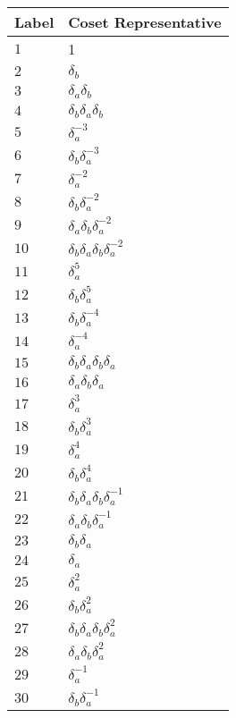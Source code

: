 \documentclass{article}
\begin{document}

\begin{center}
\begin{tabular}{ll}
\toprule
Label & Coset Representative\\
\midrule
$1$ & 1 \\
$2$ & $\delta_b^{}$ \\
$3$ & $\delta_a^{}\delta_b^{}$ \\
$4$ & $\delta_b^{}\delta_a^{}\delta_b^{}$ \\
$5$ & $\delta_a^{-3}$ \\
$6$ & $\delta_b^{}\delta_a^{-3}$ \\
$7$ & $\delta_a^{-2}$ \\
$8$ & $\delta_b^{}\delta_a^{-2}$ \\
$9$ & $\delta_a^{}\delta_b^{}\delta_a^{-2}$ \\
$10$ & $\delta_b^{}\delta_a^{}\delta_b^{}\delta_a^{-2}$ \\
$11$ & $\delta_a^{5}$ \\
$12$ & $\delta_b^{}\delta_a^{5}$ \\
$13$ & $\delta_b^{}\delta_a^{-4}$ \\
$14$ & $\delta_a^{-4}$ \\
$15$ & $\delta_b^{}\delta_a^{}\delta_b^{}\delta_a^{}$ \\
$16$ & $\delta_a^{}\delta_b^{}\delta_a^{}$ \\
$17$ & $\delta_a^{3}$ \\
$18$ & $\delta_b^{}\delta_a^{3}$ \\
$19$ & $\delta_a^{4}$ \\
$20$ & $\delta_b^{}\delta_a^{4}$ \\
$21$ & $\delta_b^{}\delta_a^{}\delta_b^{}\delta_a^{-1}$ \\
$22$ & $\delta_a^{}\delta_b^{}\delta_a^{-1}$ \\
$23$ & $\delta_b^{}\delta_a^{}$ \\
$24$ & $\delta_a^{}$ \\
$25$ & $\delta_a^{2}$ \\
$26$ & $\delta_b^{}\delta_a^{2}$ \\
$27$ & $\delta_b^{}\delta_a^{}\delta_b^{}\delta_a^{2}$ \\
$28$ & $\delta_a^{}\delta_b^{}\delta_a^{2}$ \\
$29$ & $\delta_a^{-1}$ \\
$30$ & $\delta_b^{}\delta_a^{-1}$ \\
\bottomrule
\end{tabular}

\end{center}
\end{document}

